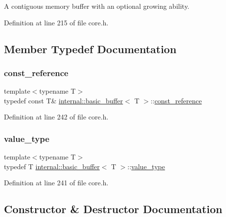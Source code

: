A contiguous memory buffer with an optional growing ability. 

Definition at line 215 of file core.\+h.



\subsection{Member Typedef Documentation}
\mbox{\label{classinternal_1_1basic__buffer_adf277d724f8082f015258414ab206743}} 
\subsubsection{\texorpdfstring{const\+\_\+reference}{const\_reference}}
{\footnotesize\ttfamily template$<$typename T$>$ \\
typedef const T\& \hyperlink{classinternal_1_1basic__buffer}{internal\+::basic\+\_\+buffer}$<$ T $>$\+::\hyperlink{classinternal_1_1basic__buffer_adf277d724f8082f015258414ab206743}{const\+\_\+reference}}



Definition at line 242 of file core.\+h.

\mbox{\label{classinternal_1_1basic__buffer_aae8a0f184091f512efbde04b2ba1ddd7}} 
\subsubsection{\texorpdfstring{value\+\_\+type}{value\_type}}
{\footnotesize\ttfamily template$<$typename T$>$ \\
typedef T \hyperlink{classinternal_1_1basic__buffer}{internal\+::basic\+\_\+buffer}$<$ T $>$\+::\hyperlink{classinternal_1_1basic__buffer_aae8a0f184091f512efbde04b2ba1ddd7}{value\+\_\+type}}



Definition at line 241 of file core.\+h.



\subsection{Constructor \& Destructor Documentation}
\mbox{\label{classinternal_1_1basic__buffer_a3d47c3be3d6f4c06e53f0b5b213057a8}} 
